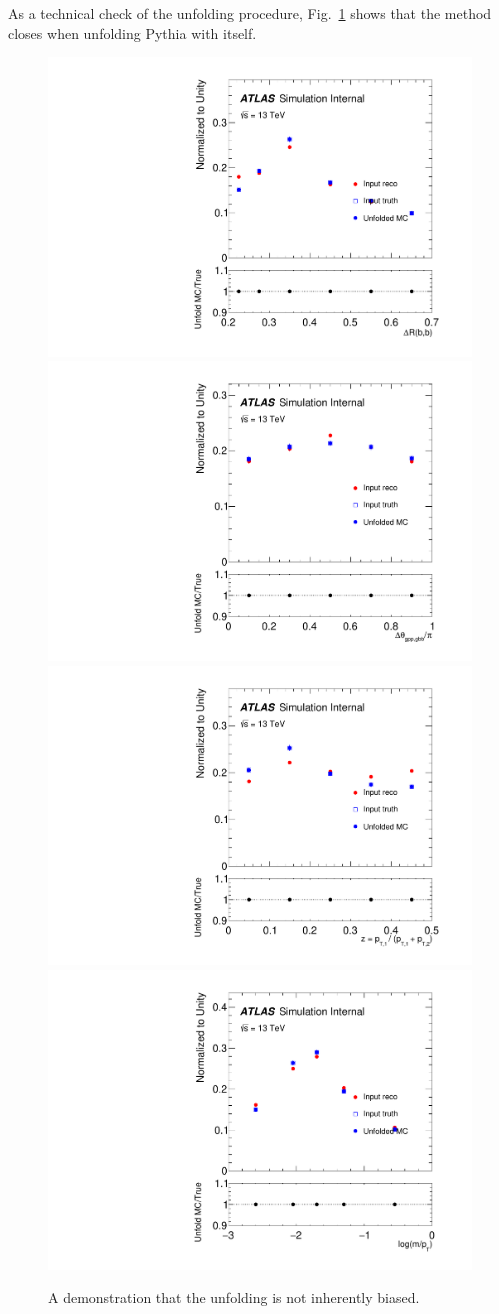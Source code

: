 As a technical check of the unfolding procedure, Fig.~\ref{fig:gbb-technicalclosure} shows that the method closes when unfolding Pythia with itself.

\begin{figure}[htpb!]
\begin{center}
  \includegraphics[width=0.45\linewidth]{figures/gbb/Unfolding/dR_technical_closure.pdf}
  \includegraphics[width=0.45\linewidth]{figures/gbb/Unfolding/dphi_technical_closure.pdf}
  \includegraphics[width=0.45\linewidth]{figures/gbb/Unfolding/ZpT_technical_closure.pdf}
  \includegraphics[width=0.45\linewidth]{figures/gbb/Unfolding/fracmasspt_technical_closure.pdf}
\caption[]{A demonstration that the unfolding is not inherently biased.} 
\label{fig:gbb-technicalclosure}
\end{center}
\end{figure}

